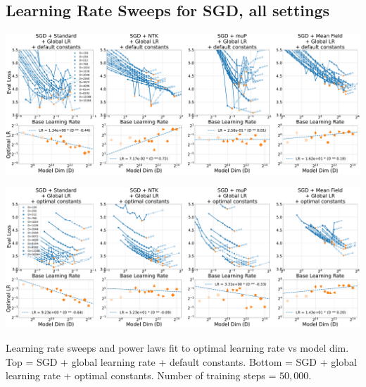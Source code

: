 \clearpage
\thispagestyle{plain}
\begin{SidewaysFigure}
\subsection{Learning Rate Sweeps for SGD, all settings}
\label{sec:app_lr_sweeps_sgd}
\vspace{12pt}
\includegraphics[width=0.98\linewidth]{icml2024/figures/lr_sweeps/appendix/sgd/sgd+50k_steps.pdf}

\figvspace

\includegraphics[width=0.98\linewidth]{icml2024/figures/lr_sweeps/appendix/sgd/sgd+50k_steps_optimal_constants_only.pdf}
\caption{Learning rate sweeps and power laws fit to optimal learning rate vs model dim. Top = SGD + global learning rate + default constants. Bottom = SGD + global learning rate + optimal constants. Number of training steps = $50{,}000$.}
\end{SidewaysFigure}
\clearpage

